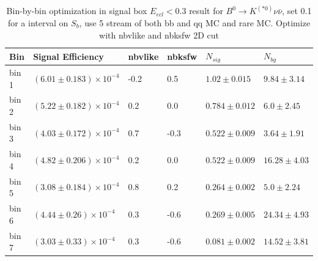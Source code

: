 \begin{table}[h]
\small
\begin{center}
\begin{tabular}{ |p{0.8cm}||p{3.7cm}||p{1.2cm}||p{1.2cm}||p{2.6cm}||p{2.7cm}| }
\hline
 Bin & Signal Efficiency & nbvlike & nbksfw & $N_{sig}$ & $N_{bg}$  \\
 \hline
 bin 1  & $(6.01 \pm 0.183) \times 10^{-4}$ &-0.2&0.5&$1.02\pm 0.015 $  &$9.84\pm 3.14 $\\ %
 \hline
 bin 2  & $(5.22 \pm 0.182)\times 10^{-4}$ &0.2& 0.0&$0.784 \pm 0.012 $&$6.0\pm 2.45 $\\ %
 \hline
 bin 3  & $(4.03 \pm 0.172)\times 10^{-4}$ &0.7&-0.3&$0.522 \pm 0.009 $&$3.64\pm 1.91 $\\ %
 \hline
 bin 4  & $(4.82 \pm 0.206)\times 10^{-4}$ &0.2&0.0&$0.522 \pm 0.009 $&$16.28\pm 4.03 $ \\ %
 \hline
 bin 5  & $(3.08\pm 0.184) \times 10^{-4}$ &0.8& 0.2&$0.264 \pm 0.002 $&$5.0\pm 2.24 $ \\ %
 \hline
 bin 6  & $(4.44\pm 0.26) \times 10^{-4}$ &0.3& -0.6&$0.269\pm 0.005 $&$24.34 \pm 4.93 $\\ %
 \hline
 bin 7  & $(3.03 \pm 0.33)\times 10^{-4}$ &0.3&-0.6&$0.081 \pm 0.002 $&$ 14.52\pm 3.81 $ \\ %
 \hline
 \hline
\end{tabular}

\caption{Bin-by-bin optimization in signal box $E_{ecl} < 0.3$ result for $B^0 \rightarrow K^{(*0)} \nu \bar{\nu}$, set 0.1 for a interval on $S_b$, use 5 stream of both bb and qq MC and rare MC. Optimize with nbvlike and nbksfw 2D cut } \label{t:optk0}
\end{center}
\end{table}


